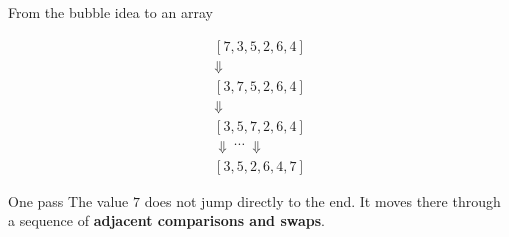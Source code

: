 \documentclass[aspectratio=169]{beamer}
\begin{document}
\begin{frame}{From the bubble idea to an array}
\small

\begin{center}


\vspace{-0.2em}

\[
\renewcommand{\arraystretch}{1.05}
\begin{array}{c}
[7,3,5,2,6,4] \\[0.15em]
\Downarrow \\[0.15em]
[3,7,5,2,6,4] \\[0.15em]
\Downarrow \\[0.15em]
[3,5,7,2,6,4] \\[0.15em]
\Downarrow\ \cdots\ \Downarrow \\[0.15em]
[3,5,2,6,4,\boxed{7}]
\end{array}
\]

\end{center}

\vspace{-0.2em}

\begin{alertblock}{One pass}
The value $7$ does not jump directly to the end.
It moves there through a sequence of \textbf{adjacent comparisons and swaps}.
\end{alertblock}

\end{frame}
\end{document}

